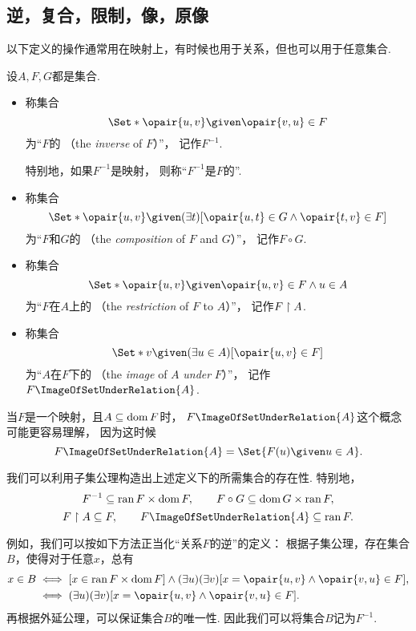 \subsection{逆，复合，限制，像，原像}
以下定义的操作通常用在映射上，有时候也用于关系，但也可以用于任意集合.
\begin{definition}\label{definition:映射.逆-复合-限制-像}
设\(A,F,G\)都是集合.
\begin{itemize}
	\item 称集合\[
		\Set*{ \opair{u,v} \given \opair{v,u} \in F }
	\]为“\(F\)的%
	（the \emph{inverse} of \(F\)）”，
	记作\(F^{-1}\).

	特别地，如果\(F^{-1}\)是映射，
	则称“\(F^{-1}\)是\(F\)的”.

	\item 称集合\[
		\Set*{ \opair{u,v} \given (\exists t)[\opair{u,t} \in G \land \opair{t,v} \in F] }
	\]为“\(F\)和\(G\)的%
	（the \emph{composition} of \(F\) and \(G\)）”，
	记作\(F \circ G\).

	\item 称集合\[
		\Set*{ \opair{u,v} \given \opair{u,v} \in F \land u \in A }
	\]为“\(F\)在\(A\)上的%
	（the \emph{restriction} of \(F\) to \(A\)）”，
	记作\(F \upharpoonright A\).

	\item 称集合\[
		\Set*{ v \given (\exists u \in A)[\opair{u,v} \in F] }
	\]为“\(A\)在\(F\)下的%
	（the \emph{image} of \(A\) \emph{under} \(F\)）”，
	记作\(F\ImageOfSetUnderRelation{A}\).
\end{itemize}
\end{definition}

当\(F\)是一个映射，且\(A \subseteq \operatorname{dom} F\)时，
\(F\ImageOfSetUnderRelation{A}\)这个概念可能更容易理解，
因为这时候\[
	F\ImageOfSetUnderRelation{A}
	= \Set{ F(u) \given u \in A }.
\]

我们可以利用子集公理构造出上述定义下的所需集合的存在性.
特别地，\[
	F^{-1} \subseteq \operatorname{ran} F \times \operatorname{dom} F, \qquad
	F \circ G \subseteq \operatorname{dom} G \times \operatorname{ran} F,
\]\[
	F \setrestrict A \subseteq F, \qquad
	F\ImageOfSetUnderRelation{A} \subseteq \ran F.
\]

例如，我们可以按如下方法正当化“关系\(F\)的逆”的定义：
根据子集公理，存在集合\(B\)，使得对于任意\(x\)，总有\begin{align*}
	x \in B
	&\iff
	[x \in \ran F \times \dom F]
	\land
	(\exists u)(\exists v)[x = \opair{u,v} \land \opair{v,u} \in F], \\
	&\iff
	(\exists u)(\exists v)[x = \opair{u,v} \land \opair{v,u} \in F].
\end{align*}
再根据外延公理，可以保证集合\(B\)的唯一性.
因此我们可以将集合\(B\)记为\(F^{-1}\).


